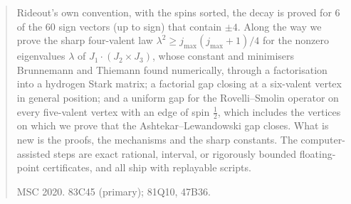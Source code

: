 \documentclass[12pt,letterpaper]{article}
\theoremstyle{esmath-tier3}
\begin{document}
\begin{quote}
Rideout's own convention, with the spins sorted, the decay is proved for $6$ of the
$60$ sign vectors (up to sign) that contain $\pm4$. Along the way we prove the sharp
four-valent law $\lambda^2\ge j_{\max}(j_{\max}+1)/4$ for the nonzero eigenvalues $\lambda$ of
$J_1\cdot(J_2\times J_3)$, whose constant and minimisers Brunnemann and Thiemann found
numerically, through a factorisation into a hydrogen Stark matrix; a factorial gap
closing at a six-valent vertex in general position; and a uniform gap for the
Rovelli--Smolin operator on every five-valent vertex with an edge of spin $\frac12$,
which includes the vertices on which we prove that the Ashtekar--Lewandowski gap closes. What is new is the proofs, the mechanisms and the sharp constants. The
computer-assisted steps are exact rational, interval, or rigorously bounded
floating-point certificates, and all ship with replayable scripts.

\smallskip\noindent\textsc{MSC 2020.} 83C45 (primary); 81Q10, 47B36.
\end{quote}













\appendix
{}











\end{document}
